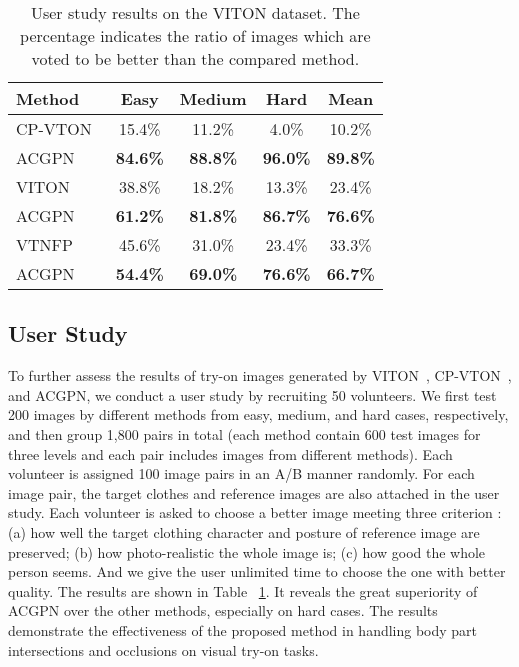 \documentclass[10pt,twocolumn,letterpaper]{article}
\begin{document}
\begin{table}
\renewcommand\tabcolsep{4pt}
\begin{center}
\footnotesize
\begin{tabular}{lcccc}
\hline
Method&Easy&Medium&Hard&Mean\\
\hline\hline
CP-VTON~\cite{DBLP:conf/eccv/WangZLCLY18}&15.4\%&11.2\%&4.0\%&10.2\%\\
ACGPN&\textbf{84.6\%}&\textbf{88.8\%}&\textbf{96.0\%}&\textbf{89.8\%}\\
\hline
VITON~\cite{DBLP:conf/cvpr/HanWWYD18}&38.8\%&18.2\%&13.3\%&23.4\%\\
ACGPN&\textbf{61.2\%}&\textbf{81.8\%}&\textbf{86.7\%}&\textbf{76.6\%}\\
\hline
VTNFP~\cite{Yu_2019_ICCV}&45.6\%&31.0\%&23.4\%&33.3\%\\
ACGPN&\textbf{54.4\%}&\textbf{69.0\%}&\textbf{76.6\%}&\textbf{66.7\%}\\





\hline

\end{tabular}

\caption{\footnotesize User study results on the VITON dataset. The percentage indicates the ratio of images which are voted to be better than the compared method.}
\label{tab:User_study}
\vspace{-20pt}
\end{center}
\end{table}




\subsection{User Study}
To further assess the results of try-on images generated by VITON~\cite{DBLP:conf/cvpr/HanWWYD18}, CP-VTON~\cite{DBLP:conf/eccv/WangZLCLY18}, and ACGPN, we conduct a user study by recruiting 50 volunteers. We first test 200 images by different methods from easy, medium, and hard cases, respectively, and then group 1,800 pairs in total (each method contain 600 test images for three levels and each pair includes images from different methods).
Each volunteer is assigned 100 image pairs in an A/B manner randomly.
For each image pair, the target clothes and reference images are also attached in the user study. Each volunteer is asked to choose a better image meeting three criterion : (a) how well the target clothing character and posture of reference image are preserved; (b) how photo-realistic the whole image is; (c) how good the whole person seems. And we give the user unlimited time to choose the one with better quality. The results are shown in Table ~\ref{tab:User_study}. It reveals the great superiority of ACGPN over the other methods, especially on hard cases. The results demonstrate the effectiveness of the proposed method in handling body part intersections and occlusions on visual try-on tasks.
\end{document}
